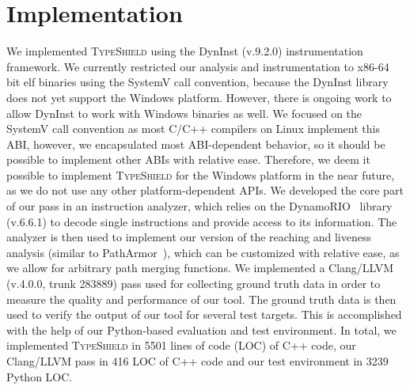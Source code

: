 \section{Implementation}
\label{chapter:Implementation}

We implemented \textsc{TypeShield} using the DynInst (v.9.2.0) instrumentation framework. We currently restricted our analysis and instrumentation to x86-64 
bit elf binaries using the SystemV call convention, because the DynInst library does not yet support the
Windows platform. However, there is ongoing work to allow DynInst to work with Windows binaries as well. We focused on the SystemV call 
convention as most C/C++ compilers on Linux implement this ABI, however, we encapsulated most ABI-dependent behavior, so it should be 
possible to implement other ABIs with relative ease. Therefore, we deem it possible to implement \textsc{TypeShield} for the Windows 
platform in the near future, as we do not use any other platform-dependent APIs. We developed the core part of our pass in an instruction
analyzer, which relies on the DynamoRIO~\cite{dynamorio:drmemory} library (v.6.6.1) to decode single instructions and provide access to
its information. The analyzer is then used to implement our version of the reaching and liveness analysis (similar to PathArmor~\cite{veen:typearmor}), 
which can be customized with relative ease, as we allow for arbitrary path merging functions. We implemented a 
Clang/LLVM (v.4.0.0, trunk 283889) pass used for 
collecting ground truth data in order to measure the quality and performance of our tool. The ground truth data is then used to verify 
the output of our tool for several test targets. This is accomplished with the help of our Python-based evaluation and test environment. 
In total, we implemented \textsc{TypeShield} in 5501 lines of code (LOC) of C++ code, our Clang/LLVM pass in 416 LOC
of C++ code and our test environment in 3239 Python LOC. 


